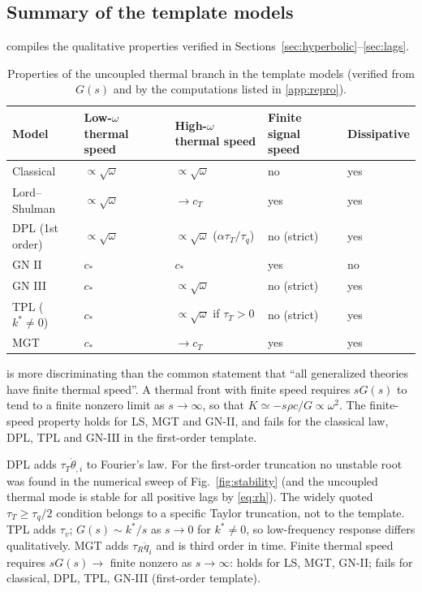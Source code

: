 \subsection{Summary of the template models}
 compiles the qualitative properties verified in Sections~\ref{sec:hyperbolic}--\ref{sec:lags}.
\begin{table}[t]\centering\small
\caption{Properties of the uncoupled thermal branch in the template models (verified from $G(s)$ and by the computations listed in \cref{app:repro}).}\label{tab:compare}
\begin{tabular}{@{}p{3.2cm}p{2.3cm}p{2.3cm}p{2.3cm}p{2.6cm}@{}}\toprule
Model & Low-$\omega$ thermal speed & High-$\omega$ thermal speed & Finite signal speed & Dissipative\\\midrule
Classical & $\propto\sqrt{\omega}$ & $\propto\sqrt{\omega}$ & no & yes\\
Lord--Shulman & $\propto\sqrt{\omega}$ & $\to c_T$ & yes & yes\\
DPL (1st order) & $\propto\sqrt{\omega}$ & $\propto\sqrt{\omega}$ ($\alpha\tau_T/\tau_q$) & no (strict) & yes\\
GN II & $c_*$ & $c_*$ & yes & no\\
GN III & $c_*$ & $\propto\sqrt{\omega}$ & no (strict) & yes\\
TPL ($k^*\neq0$) & $c_*$ & $\propto\sqrt{\omega}$ if $\tau_T>0$ & no (strict) & yes\\
MGT & $c_*$ & $\to c_T$ & yes & yes\\\bottomrule
\end{tabular}
\end{table}
 is more discriminating than the common statement that ``all generalized theories have finite thermal speed''. A thermal front with finite speed requires $sG(s)$ to tend to a finite nonzero limit as $s\to\infty$, so that $K\simeq-s\rho c/G\propto\omega^2$. The finite-speed property holds for LS, MGT and GN-II, and fails for the classical law, DPL, TPL and GN-III in the first-order template.


\begin{summarybox}[Summary]
DPL adds $\tau_T\dot\theta_{,i}$ to Fourier's law. For the first-order truncation no unstable root was found in the numerical sweep of Fig.~\ref{fig:stability} (and the uncoupled thermal mode is stable for all positive lags by \eqref{eq:rh}). The widely quoted $\tau_T\ge\tau_q/2$ condition belongs to a specific Taylor truncation, not to the template. TPL adds $\tau_v$; $G(s)\sim k^*/s$ as $s\to0$ for $k^*\ne0$, so low-frequency response differs qualitatively. MGT adds $\tau_R\ddot q_i$ and is third order in time. Finite thermal speed requires $sG(s)\to$ finite nonzero as $s\to\infty$: holds for LS, MGT, GN-II; fails for classical, DPL, TPL, GN-III (first-order template).
\end{summarybox}
